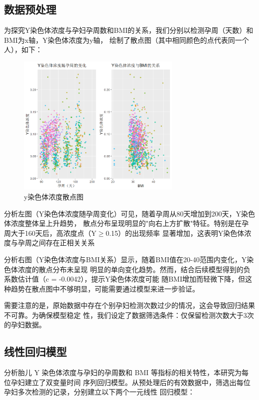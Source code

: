 \documentclass{article}
\begin{document}
\subsection{\textbf{数据预处理}}
为探究Y染色体浓度与孕妇孕周数和BMI的关系，我们分别以检测孕周（天数）和BMI为x轴，Y染色体浓度为y轴，
绘制了散点图（其中相同颜色的点代表同一个人），如下：
\begin{figure}[H]  %
    \centering  %
    \includegraphics[width=0.7\textwidth]{graph/sss.png}  %
    \caption{y染色体浓度散点图}  %
    \label{fig:single}  %
\end{figure}
分析左图（Y染色体浓度随孕周变化）可见，随着孕周从80天增加到200天，Y染色体浓度整体呈上升趋势，
散点分布呈现明显的"向右上方扩散"特征。特别是在孕周大于160天后，高浓度点（Y$\geq$0.15）的出现频率
显著增加，这表明Y染色体浓度与孕周之间存在正相关关系

分析右图（Y染色体浓度与BMI关系）显示，随着BMI值在20-40范围内变化，Y染色体浓度的散点分布未呈现
明显的单向变化趋势。然而，结合后续模型得到的负系数估计值（c = -0.0042），提示Y染色体浓度可能
随BMI增加而轻微下降，但这种趋势在散点图中不够明显，可能需要通过模型来进一步验证。

需要注意的是，原始数据中存在个别孕妇检测次数过少的情况，这会导致回归结果不可靠。为确保模型稳定
性，我们设定了数据筛选条件：仅保留检测次数大于3次的孕妇数据。
\subsection{\textbf{线性回归模型}}
分析胎儿 Y 染色体浓度与孕妇的孕周数和 BMI 等指标的相关特性，本研究为每位孕妇建立了双变量时间
序列回归模型。从预处理后的有效数据中，筛选出每位孕妇多次检测的记录，分别建立以下两个一元线性
回归模型：
\end{document}

